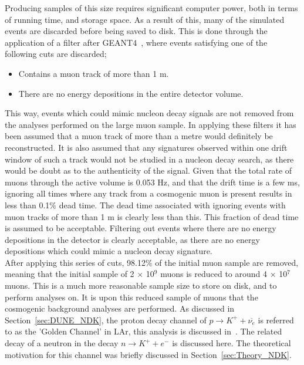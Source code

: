 Producing samples of this size requires significant computer power, both in terms of running time, and storage space. As a result of this, many of the simulated events are discarded before being saved to disk. This is done through the application of a filter after GEANT4~\citep{GEANT4}, where events satisfying one of the following cuts are discarded;
\begin{itemize}
\item Contains a muon track of more than 1 m.
\item There are no energy depositions in the entire detector volume.
\end{itemize}
This way, events which could mimic nucleon decay signals are not removed from the analyses performed on the large muon sample. In applying these filters it has been assumed that a muon track of more than a metre would definitely be reconstructed. It is also assumed that any signatures observed within one drift window of such a track would not be studied in a nucleon decay search, as there would be doubt as to the authenticity of the signal. Given that the total rate of muons through the active volume is 0.053 Hz, and that the drift time is a few ms, ignoring all times where any track from a cosmogenic muon is present results in less than 0.1\% dead time. The dead time associated with ignoring events with muon tracks of more than 1 m is clearly less than this. This fraction of dead time is assumed to be acceptable. Filtering out events where there are no energy depositions in the detector is clearly acceptable, as there are no energy depositions which could mimic a nucleon decay signature. \\

After applying this series of cuts, 98.12\% of the initial muon sample are removed, meaning that the initial sample of 2 $\times$ 10$^9$ muons is reduced to around 4 $\times$ 10$^{7}$ muons. This is a much more reasonable sample size to store on disk, and to perform analyses on. It is upon this reduced sample of muons that the cosmogenic background analyses are performed. As discussed in Section~\ref{sec:DUNE_NDK}, the proton decay channel of $p \rightarrow K^{+} + \overline{\nu_{e}}$ is referred to as the 'Golden Channel' in LAr, this analysis is discussed in~\citep{NDKTFNote}. The related decay of a neutron in the decay $n \rightarrow K^{+} + e^{-}$ is discussed here. The theoretical motivation for this channel was briefly discussed in Section~\ref{sec:Theory_NDK}. \\


